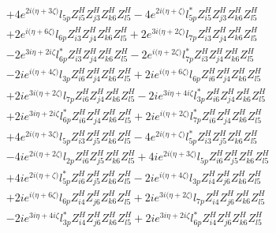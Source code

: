 \begin{align}
 &+4 e^{2 i \Big(\eta +3 \zeta \Big)} l_{5p} Z_{{i 5}}^{H} Z_{{j 3}}^{H} Z_{{k 6}}^{H} Z_{{l 5}}^{H} -4 e^{2 i \Big(\eta +\zeta \Big)} l_{5p}^* Z_{{i 5}}^{H} Z_{{j 3}}^{H} Z_{{k 6}}^{H} Z_{{l 5}}^{H} \nonumber \\ 
 &+2 e^{i \Big(\eta +6 \zeta \Big)} l_{6p} Z_{{i 3}}^{H} Z_{{j 4}}^{H} Z_{{k 6}}^{H} Z_{{l 5}}^{H} +2 e^{3 i \Big(\eta +2 \zeta \Big)} l_{7p} Z_{{i 3}}^{H} Z_{{j 4}}^{H} Z_{{k 6}}^{H} Z_{{l 5}}^{H} \nonumber \\ 
 &-2 e^{3 i \eta +2 i \zeta } l_{6p}^* Z_{{i 3}}^{H} Z_{{j 4}}^{H} Z_{{k 6}}^{H} Z_{{l 5}}^{H} -2 e^{i \Big(\eta +2 \zeta \Big)} l_{7p}^* Z_{{i 3}}^{H} Z_{{j 4}}^{H} Z_{{k 6}}^{H} Z_{{l 5}}^{H} \nonumber \\ 
 &-2 i e^{i \Big(\eta +4 \zeta \Big)} l_{3p} Z_{{i 6}}^{H} Z_{{j 4}}^{H} Z_{{k 6}}^{H} Z_{{l 5}}^{H} +2 i e^{i \Big(\eta +6 \zeta \Big)} l_{6p} Z_{{i 6}}^{H} Z_{{j 4}}^{H} Z_{{k 6}}^{H} Z_{{l 5}}^{H} \nonumber \\ 
 &+2 i e^{3 i \Big(\eta +2 \zeta \Big)} l_{7p} Z_{{i 6}}^{H} Z_{{j 4}}^{H} Z_{{k 6}}^{H} Z_{{l 5}}^{H} -2 i e^{3 i \eta +4 i \zeta } l_{3p}^* Z_{{i 6}}^{H} Z_{{j 4}}^{H} Z_{{k 6}}^{H} Z_{{l 5}}^{H} \nonumber \\ 
 &+2 i e^{3 i \eta +2 i \zeta } l_{6p}^* Z_{{i 6}}^{H} Z_{{j 4}}^{H} Z_{{k 6}}^{H} Z_{{l 5}}^{H} +2 i e^{i \Big(\eta +2 \zeta \Big)} l_{7p}^* Z_{{i 6}}^{H} Z_{{j 4}}^{H} Z_{{k 6}}^{H} Z_{{l 5}}^{H} \nonumber \\ 
 &+4 e^{2 i \Big(\eta +3 \zeta \Big)} l_{5p} Z_{{i 3}}^{H} Z_{{j 5}}^{H} Z_{{k 6}}^{H} Z_{{l 5}}^{H} -4 e^{2 i \Big(\eta +\zeta \Big)} l_{5p}^* Z_{{i 3}}^{H} Z_{{j 5}}^{H} Z_{{k 6}}^{H} Z_{{l 5}}^{H} \nonumber \\ 
 &-4 i e^{2 i \Big(\eta +2 \zeta \Big)} l_{2p} Z_{{i 6}}^{H} Z_{{j 5}}^{H} Z_{{k 6}}^{H} Z_{{l 5}}^{H} +4 i e^{2 i \Big(\eta +3 \zeta \Big)} l_{5p} Z_{{i 6}}^{H} Z_{{j 5}}^{H} Z_{{k 6}}^{H} Z_{{l 5}}^{H} \nonumber \\ 
 &+4 i e^{2 i \Big(\eta +\zeta \Big)} l_{5p}^* Z_{{i 6}}^{H} Z_{{j 5}}^{H} Z_{{k 6}}^{H} Z_{{l 5}}^{H} -2 i e^{i \Big(\eta +4 \zeta \Big)} l_{3p} Z_{{i 4}}^{H} Z_{{j 6}}^{H} Z_{{k 6}}^{H} Z_{{l 5}}^{H} \nonumber \\ 
 &+2 i e^{i \Big(\eta +6 \zeta \Big)} l_{6p} Z_{{i 4}}^{H} Z_{{j 6}}^{H} Z_{{k 6}}^{H} Z_{{l 5}}^{H} +2 i e^{3 i \Big(\eta +2 \zeta \Big)} l_{7p} Z_{{i 4}}^{H} Z_{{j 6}}^{H} Z_{{k 6}}^{H} Z_{{l 5}}^{H} \nonumber \\ 
 &-2 i e^{3 i \eta +4 i \zeta } l_{3p}^* Z_{{i 4}}^{H} Z_{{j 6}}^{H} Z_{{k 6}}^{H} Z_{{l 5}}^{H} +2 i e^{3 i \eta +2 i \zeta } l_{6p}^* Z_{{i 4}}^{H} Z_{{j 6}}^{H} Z_{{k 6}}^{H} Z_{{l 5}}^{H} \nonumber \\ 

\end{align}
